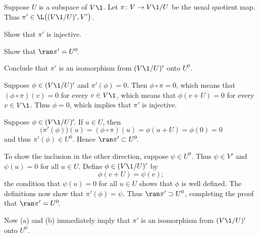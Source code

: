 \exercise
Suppose $U$ is a subspace of $V\1$. Let $\pi \colon V \to V\1/U$ be the usual quotient map. Thus $\pi' \in \L\bigl((V\1/U)', V'\bigr)$.
\begin{subtheorem}
\item
Show that $\pi'$ is injective.
\item
Show that $\ran \pi' = U^0\!$.
\item
Conclude that $\pi'$ is an isomorphism from $(V\1/U)'$ onto $U^0\!$.
\end{subtheorem}

\begin{Solution}
\begin{subtheorem}
\item
Suppose $\phi \in (V\1/U)'$ and $\pi' \! (\phi) = 0$. Then $\phi \circ \pi = 0$, which means that $(\phi \circ \pi)(v) = 0$ for every $v\in V\1$, which means that $\phi(v + U) = 0$ for every $v \in V\1$. Thus $\phi = 0$, which implies that $\pi'$ is injective.

\item
Suppose $\phi \in (V\1/U)'\!$. If $u \in U$, then
\[
\bigl( \pi' \! (\phi) \bigr)(u) = (\phi \circ \pi)(u) = \phi( u + U) = \phi(0) = 0
\]
and thus $\pi' \! (\phi) \in U^0\!$. Hence $\ran \pi' \subset U^0\!$.

To show the inclusion in the other direction, suppose $\psi \in U^0\!$. Thus $\psi \in V'$ and $\psi(u) = 0$ for all $u \in U$. Define $\phi \in (V\1/U)'$ by
\[
\phi(v+ U) = \psi(v);
\]
the condition that $\psi(u) = 0$ for all $u \in U$ shows that $\phi$ is well defined. The definitions now show that $\pi' \! (\phi) = \psi$. Thus $\ran \pi' \supset U^0$, completing the proof that $\ran \pi' = U^0\!$.

\item
Now (a) and (b) immediately imply that $\pi'$ is an isomorphism from $(V\1/U)'$ onto $U^0\!$.
\end{subtheorem}
\end{Solution}

